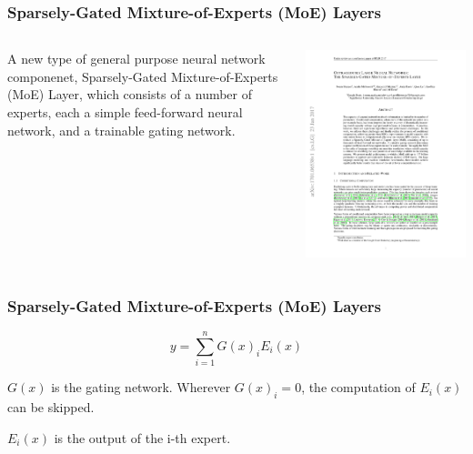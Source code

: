 \documentclass[12pt,aspectratio=169]{beamer}
\begin{document}
    \begin{frame}
        \frametitle{Sparsely-Gated Mixture-of-Experts (MoE) Layers}

        \begin{columns}
        \begin{column}{0.35\textwidth}
            A new type of general purpose neural network componenet, Sparsely-Gated Mixture-of-Experts (MoE) Layer,
            which consists of a number of experts, each a simple feed-forward neural network, and a trainable gating network.
        \end{column}
        \begin{column}{0.65\textwidth}
            \includegraphics[page=2,trim=4cm 18.7cm 5.2cm 3cm,clip,scale=0.73]{MoE.pdf}
        \end{column}
        \end{columns}
    \end{frame}

    \begin{frame}
        \frametitle{Sparsely-Gated Mixture-of-Experts (MoE) Layers}

        $$ y = \sum^n_{i=1}G(x)_iE_i(x) $$

        $G(x)$ is the gating network. Wherever $G(x)_i = 0$, the computation of $E_i(x)$ can be skipped.

        $E_i(x)$ is the output of the i-th expert.

    \end{frame}
\end{document}
